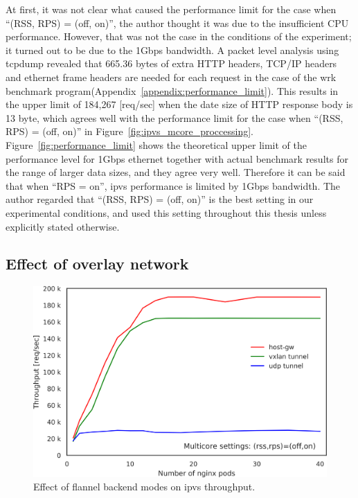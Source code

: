 At first, it was not clear what caused the performance limit for the case when \enquote{(RSS, RPS) = (off, on)},
the author thought it was due to the insufficient CPU performance.
However, that was not the case in the conditions of the experiment; it turned out to be due to the 1Gbps bandwidth.
A packet level analysis using tcpdump\cite{jacobson1989tcpdump} revealed that 665.36 bytes of extra HTTP headers,
TCP/IP headers and ethernet frame headers are needed for each request in the case of the wrk benchmark program(Appendix~\ref{appendix:performance_limit}).
This results in the upper limit of 184,267 [req/sec] when the date size of HTTP response body is 13 byte, which agrees well with the performance limit for the case when \enquote{(RSS, RPS) = (off, on)} in Figure~\ref{fig:ipvs_mcore_proccessing}.
Figure~\ref{fig:performance_limit} shows the theoretical upper limit of the performance level for 1Gbps ethernet together with actual benchmark results for the range of larger data sizes, and they agree very well.
Therefore it can be said that when \enquote{RPS = on}, ipvs performance is limited by 1Gbps bandwidth.
The author regarded that \enquote{(RSS, RPS) = (off, on)} is the best setting in our experimental conditions, and used this setting throughout this thesis unless explicitly stated otherwise.


\FloatBarrier

\subsection{Effect of overlay network}

\begin{figure}[h]
  \centering
  \includegraphics[width=0.8\columnwidth]{Figs/ipvs_flannel_mode}
  \caption{Effect of flannel backend modes on ipvs throughput.}
  \label{fig:ipvs_flannel_mode}
\end{figure}

